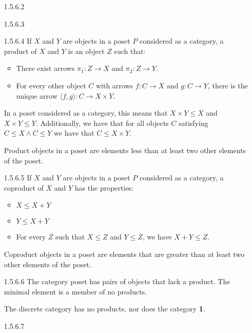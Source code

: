 \documentclass{article}
\begin{document}
\begin{enumerate}
\item [1.5.6.2]
\item [1.5.6.3]
\item [1.5.6.4]
  If $X$ and $Y$ are objects in a poset $P$ considered as a category, a product of $X$ and $Y$ is an object $Z$ such that:
  \begin{itemize}
  \item There exist arrows $\pi_1 : Z \rightarrow X$ and $\pi_2 : Z \rightarrow Y$.
  \item For every other object $C$ with arrows $f : C \rightarrow X$ and $g : C \rightarrow Y$, there is the unique arrow $\langle f , g \rangle : C \rightarrow X \times Y$.
  \end{itemize}
  In a poset considered as a category, this means that $X \times Y \le X$ and $X \times Y \le Y$.
  Additionally, we have that for all objects $C$ satisfying $C \le X \wedge C \le Y$ we have that $C \le X \times Y$.

  Product objects in a poset are elements less than at least two other elements of the poset.

\item [1.5.6.5]
  If $X$ and $Y$ are objects in a poset $P$ considered as a category, a coproduct of $X$ and $Y$ has the properties:
  \begin{itemize}
  \item $X \le X + Y$
  \item $Y \le X + Y$
  \item For every $Z$ such that $X \le Z$ and $Y \le Z$, we have $X + Y \le Z$.
  \end{itemize}

  Coproduct objects in a poset are elements that are greater than at least two other elements of the poset.

\item [1.5.6.6]
  The category poset has pairs of objects that lack a product.
  The minimal element is a member of no products.

  The discrete category has no products, nor does the category \textbf{1}.
  
\item [1.5.6.7]
  

\end{enumerate}
\end{document}
